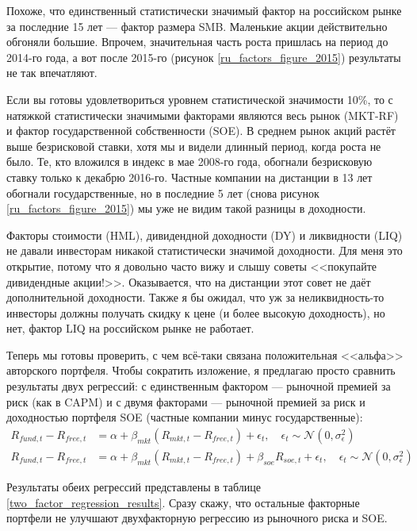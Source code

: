 Похоже, что единственный статистически значимый фактор на российском рынке за 
последние 15 лет --- фактор размера SMB. Маленькие акции действительно обгоняли 
большие. Впрочем, значительная часть роста пришлась на период до 2014-го года, а 
вот после 2015-го (рисунок \ref{ru_factors_figure_2015}) результаты не так 
впечатляют.

Если вы готовы удовлетвориться уровнем статистической значимости 10\%, то с 
натяжкой статистически значимыми факторами являются весь рынок (MKT-RF) и фактор 
государственной собственности (SOE). В среднем рынок акций растёт выше 
безрисковой ставки, хотя мы и видели длинный период, когда роста не было. Те, 
кто вложился в индекс в мае 2008-го года, обогнали безрисковую ставку только к 
декабрю 2016-го. Частные компании на дистанции в 13 лет обогнали 
государственные, но в последние 5 лет (снова рисунок 
\ref{ru_factors_figure_2015}) мы уже не видим такой разницы в доходности.

Факторы стоимости (HML), дивидендной доходности (DY) и ликвидности (LIQ) не 
давали инвесторам никакой статистически значимой доходности. Для меня это 
открытие, потому что я довольно часто вижу и слышу советы <<покупайте 
дивидендные акции!>>. Оказывается, что на дистанции этот совет не даёт 
дополнительной доходности. Также я бы ожидал, что уж за неликвидность-то 
инвесторы должны получать скидку к цене (и более высокую доходность), но нет, 
фактор LIQ на российском рынке не работает.

Теперь мы готовы проверить, с чем всё-таки связана положительная <<альфа>> 
авторского портфеля. Чтобы сократить изложение, я предлагаю просто сравнить 
результаты двух регрессий: с единственным фактором --- рыночной премией за риск 
(как в CAPM) и с двумя факторами --- рыночной премией за риск и доходностью 
портфеля SOE (частные компании минус государственные):
\begin{align*}
R_{fund,t} - R_{free,t} &=
\alpha + \beta_{mkt}(R_{mkt,t} - R_{free,t}) + \epsilon_t,
\quad
\epsilon_t \sim \mathcal{N}(0, \sigma_{\epsilon}^2) \\
R_{fund,t} - R_{free,t} &= \alpha 
+ \beta_{mkt}(R_{mkt,t} - R_{free,t}) + \beta_{soe}R_{soe,t} + \epsilon_t,
\quad
\epsilon_t \sim \mathcal{N}(0, \sigma_{\epsilon}^2)
\end{align*}

Результаты обеих регрессий представлены в таблице 
\ref{two_factor_regression_results}. Сразу скажу, что остальные факторные 
портфели не улучшают двухфакторную регрессию из рыночного риска и SOE.

